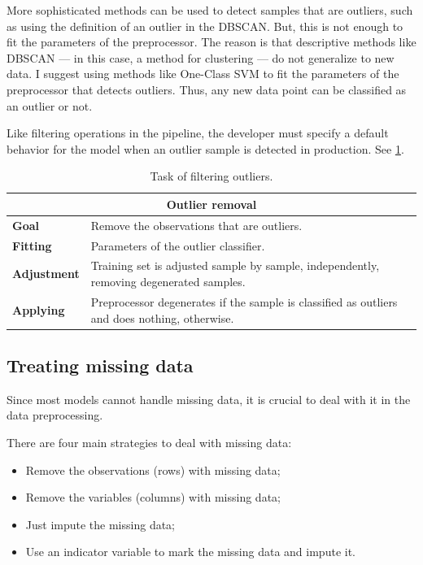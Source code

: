 More sophisticated methods can be used to detect samples that are outliers, such as using
the definition of an outlier in the DBSCAN. But, this is not
enough to fit the parameters of the preprocessor.  The reason is that descriptive methods
like DBSCAN  --- in this case, a method for clustering --- do not generalize to new data.
I suggest using methods like One-Class SVM to fit the
parameters of the preprocessor that detects outliers.  Thus, any new data point can
be classified as an outlier or not.

Like filtering operations in the pipeline, the developer must specify a default behavior
for the model when an outlier sample is detected in production.  See
\cref{tab:outlier-removal}.

\begin{table}\caption{Task of filtering outliers.}
  \centering
  \begin{tabular}{lp{6cm}}
    \toprule
    \multicolumn{2}{c}{\textbf{Outlier removal}} \\
    \midrule
    \textbf{Goal} &
      Remove the observations that are outliers. \\
    \textbf{Fitting} &
      Parameters of the outlier classifier. \\
    \textbf{Adjustment} &
      Training set is adjusted sample by sample, independently, removing
      degenerated samples. \\
    \textbf{Applying} &
      Preprocessor degenerates if the sample is classified as outliers and does
      nothing, otherwise. \\
    \bottomrule
  \end{tabular}
  \label{tab:outlier-removal}
\end{table}

\subsection{Treating missing data}

Since most models cannot handle missing data, it is crucial to deal with it in the data
preprocessing.

There are four main strategies to deal with missing data:
\begin{itemize}
  \itemsep0em
  \item Remove the observations (rows) with missing data;
  \item Remove the variables (columns) with missing data;
  \item Just impute the missing data;
  \item Use an indicator variable to mark the missing data and impute it.
\end{itemize}

